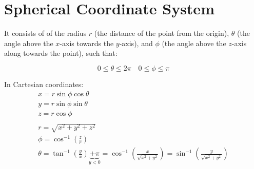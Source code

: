 \documentclass[00_complete]{subfiles}
\begin{document}
\section{Spherical Coordinate System}

It consists of of the radius \(r\) (the distance of the point from the
origin), \(\theta\) (the angle above the \(x\)-axis towards the
\(y\)-axis), and \(\phi\) (the angle above the \(z\)-axis along
towards the point), such that:

\[
0 \leq \theta \leq 2 \pi \quad 0 \leq \phi \leq \pi
\]

In Cartesian coordinates: \[
\begin{gathered}
    x = r \sin \phi \cos \theta \\
    y = r \sin \phi \sin \theta \\
    z = r \cos \phi \\
    \\
    r = \sqrt{x^2+y^2+z^2} \\
    \phi = \cos^{-1}\left(\frac{z}{r}\right) \\
    \theta = \tan^{-1}\left(\frac{y}{x}\right) \underbrace{+\pi}_{y<0}
    = \cos^{-1}\left(\frac{x}{\sqrt{x^2+y^2}}\right)
    = \sin^{-1}\left(\frac{y}{\sqrt{x^2+y^2}}\right)
\end{gathered}
\]
\end{document}
